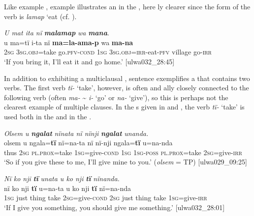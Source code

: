   Like example , example  illustrates an  in the , here ly clearer since the form of the verb is \textit{lamap} {‘eat}  (cf. ).



\ea%
    \label{ex:syntax:249}
          \textit{U mat ita nï} \textbf{\textit{malamap}} \textit{wa} \textbf{\textit{mana}}.\\
\gll u    ma=tï      i-ta        nï    \textbf{ma=la{}-ama-p} wa      \textbf{ma-na}\\
    2\textsc{sg}  3\textsc{sg.obj}=take  go.\textsc{pfv-cond}  \textsc{1sg}  3\textsc{sg.obj}=\textsc{irr}{}-eat-\textsc{pfv}    village    go-\textsc{irr}\\
\glt `If you bring it, I’ll eat it and go home.’ [ulwa032\_28:45]
\z

In addition to exhibiting a multiclausal , sentence  exemplifies a  that contains two verbs. The first verb \textit{tï-} ‘take’, however, is often  and ally closely connected to the following verb (often \textit{ma-} {\textasciitilde} \textit{i-} ‘go’ or \textit{na-} ‘give’), so this is perhaps not the clearest example of multiple clauses. In the s given in  and , the verb \textit{tï-} ‘take’ is used both in the  and in the .

\ea%
    \label{ex:syntax:250}
          \textit{Olsem u} \textbf{\textit{ngalat}} \textit{nïnata nï nïnji} \textbf{\textit{ngalat}} \textit{unanda.}\\
\gll    olsem  u    ngala=\textbf{tï}    nï=na-ta      nï    nï-nji ngala=\textbf{tï}    u=na-nda\\
    thus  \textsc{2sg}  \textsc{pl.prox}=take  1\textsc{sg}=give-\textsc{cond}  \textsc{1sg}  \textsc{1sg-poss}    \textsc{pl.prox}=take  2\textsc{sg}=give-\textsc{irr}\\
\glt `So if you give these to me, I’ll give mine to you.’ (\textit{olsem} = TP) [ulwa029\_09:25]
\z

\ea%
    \label{ex:syntax:251}
          \textit{Nï ko nji} \textbf{\textit{tï}} \textit{unata u ko nji} \textbf{\textit{tï}} \textit{nïnanda.}\\
\gll    nï    ko  nji    \textbf{tï}    u=na-ta      u    ko    nji \textbf{tï}    nï=na-nda\\
    1\textsc{sg}  just  thing  take  2\textsc{sg}=give-\textsc{cond}  \textsc{2sg}  just    thing    take  1\textsc{sg}=give-\textsc{irr}\\
\glt `If I give you something, you should give me something.’ [ulwa032\_28:01]
\z

